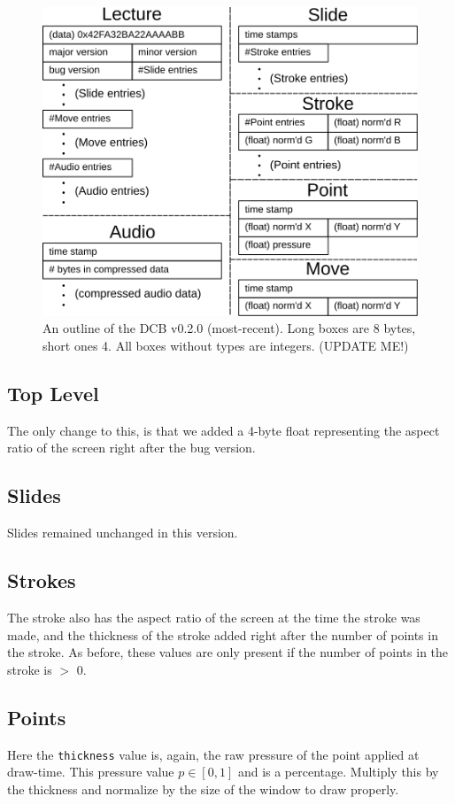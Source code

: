 \begin{figure}[ht]
  \centering
  \includegraphics[width=.8\columnwidth]{figures/dcb-ff-v0-2-0}
  \caption{An outline of the DCB v0.2.0 (most-recent). Long boxes are 8 bytes, short ones 4. All boxes without types are integers.  (UPDATE ME!)}
  \label{fig:dcb-ff-v0.2.0}
\end{figure}

\subsection{Top Level}
The only change to this, is that we added a 4-byte float representing the aspect ratio of the screen right after the bug version.

\subsection{Slides}
Slides remained unchanged in this version.

\subsection{Strokes}
The stroke also has the aspect ratio of the screen at the time the stroke was made, and the thickness of the stroke added right after the number of points in the stroke.  As before, these values are only present if the number of points in the stroke is $>$ 0.

\subsection{Points}
Here the {\tt thickness} value is, again, the raw pressure of the point applied at draw-time.  This pressure value $p \in [0,1]$ and is a percentage.  Multiply this by the thickness and normalize by the size of the window to draw properly.
